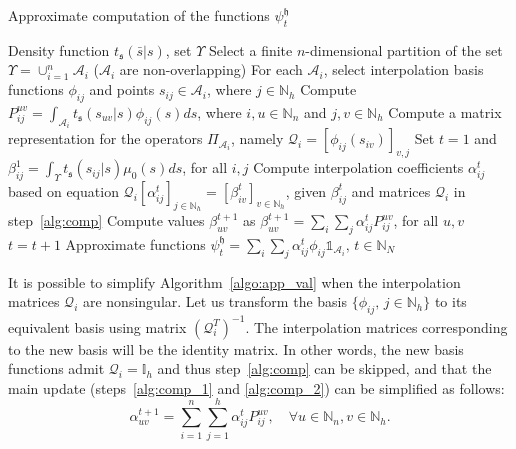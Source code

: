 \documentclass{LMCS}
\begin{document}
\begin{algorithm}
\caption{Approximate computation of the functions $\psi^{\mathfrak h}_t$}
\label{algo:app_val}
\begin{center}
\begin{algorithmic}[1]
\REQUIRE 
Density function $t_{\mathfrak s}(\bar s|s)$, 
set $\Upsilon$ 
\STATE
Select a finite $n$-dimensional partition of the set $\Upsilon = \cup_{i=1}^{n}\mathcal A_i$
($\mathcal A_i$ are non-overlapping)
\STATE
For each $\mathcal A_i$, select interpolation basis functions $\phi_{ij}$
and points $s_{ij}\in \mathcal A_i$, where $j\in\mathbb N_h$
\STATE \label{alg:marginals}
Compute $P_{ij}^{uv} = \int_{\mathcal A_i}t_{\mathfrak s}(s_{uv}|s)\phi_{ij}(s)ds$, where $i,u\in\mathbb N_n$ and $j,v\in\mathbb N_h$
\STATE \label{alg:comp}
Compute a matrix representation for the operators $\Pi_{\mathcal A_i}$, namely $\mathcal Q_i = [\phi_{ij}(s_{iv})]_{v,j}$
\STATE \label{alg:init_marginals}
 Set $t=1$ and $\beta^1_{ij} = \int_{\Upsilon}t_{\mathfrak s}(s_{ij}|s)\mu_0(s)ds$, for all $i,j$
\STATE \label{alg:comp_1} 
Compute interpolation coefficients $\alpha_{ij}^t$ based on equation
$\mathcal Q_i [\alpha_{ij}^t]_{j\in\mathbb N_h} = [\beta^t_{iv}]_{v\in\mathbb N_h}$,
given $\beta^t_{ij}$ and matrices $\mathcal Q_i$ in step~\ref{alg:comp}
\STATE \label{alg:comp_2}
Compute values $\beta^{t+1}_{uv}$ as $\beta^{t+1}_{uv} = \sum_i\sum_j\alpha_{ij}^{t}P_{ij}^{uv}$, for all $u,v$
\STATE
$t = t+1$
\ENDIF
\ENSURE
Approximate functions $\psi^{\mathfrak h}_t = \sum_i\sum_j\alpha_{ij}^{t}\phi_{ij}\mathds{1}_{\mathcal A_i},\, t\in\mathbb N_N$
\end{algorithmic}
\end{center}
\end{algorithm}

It is possible to simplify Algorithm~\ref{algo:app_val} when the interpolation matrices $\mathcal Q_i$ are nonsingular.
Let us transform the basis $\{\phi_{ij},\,j\in\mathbb N_h\}$ to its equivalent basis using matrix $\left(\mathcal Q_i^T\right)^{-1}$. The interpolation matrices corresponding to the new basis will be the identity matrix. In other words, the new basis functions admit $\mathcal Q_i = \mathbb I_h$ and thus
step~\ref{alg:comp} can be skipped, 
and that the main update (steps~\ref{alg:comp_1} and \ref{alg:comp_2}) can be simplified as follows: 
\begin{equation*}
\alpha_{uv}^{t+1} = \sum_{i=1}^{n}\sum_{j=1}^{h}\alpha_{ij}^t P_{ij}^{uv}, 
\quad\forall u\in\mathbb N_n,v\in\mathbb N_h.
\end{equation*}
\end{document}

